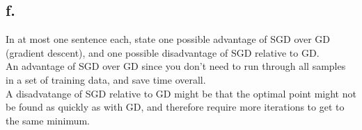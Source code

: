 \documentclass{article}
\newcommand{\1}{\mathbf{1}}
\begin{document}
{\subsection*{f.}

In at most one sentence each, state one possible advantage of SGD over GD (gradient descent), and one possible disadvantage of SGD relative to GD. \\

An advantage of SGD over GD since you don't need to run through all samples in a set of training data, and save time overall. \\ 
A disadvatange of SGD relative to GD might be that the optimal point might not be found as quickly as with GD, and therefore require more iterations to get to the same minimum.

}
\end{document}
